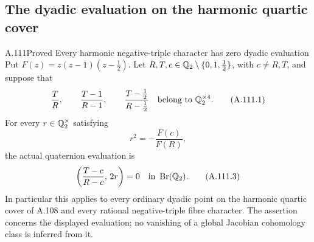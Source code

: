 \subsection{The dyadic evaluation on the harmonic quartic cover}

\begin{statement}{A.111}{Proved}
{Every harmonic negative-triple character has zero dyadic evaluation}
Put $F(z)=z(z-1)(z-\tfrac12)$.
Let $R,T,c\in\mathbb Q_2\setminus\{0,1,\tfrac12\}$, with
$c\ne R,T$, and suppose that
\[
 \frac{T}{R},\qquad\frac{T-1}{R-1},\qquad
                  \frac{T-\tfrac12}{R-\tfrac12}
                         \quad\hbox{belong to }\mathbb Q_2^{\times4}.
\tag{A.111.1}
\]
For every $r\in\mathbb Q_2^\times$ satisfying
\[
                 r^2=-\frac{F(c)}{F(R)},
\tag{A.111.2}
\]
the actual quaternion evaluation is
\[
       \left(\frac{T-c}{R-c},\,2r\right)=0
                                      \quad\hbox{in }\operatorname{Br}(\mathbb Q_2).
\tag{A.111.3}
\]
In particular this applies to every ordinary dyadic point
on the harmonic quartic cover of A.108 and every rational
negative-triple fibre character.  The assertion concerns
the displayed evaluation; no vanishing of a global
Jacobian cohomology class is inferred from it.
\end{statement}
